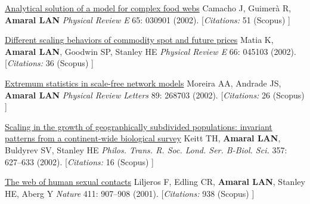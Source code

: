 \NumberedItem{\makebox[0.8cm][r]{[42]}}
\href{/people/amaral/analytical-solution-of-a-model-for-complex-food-webs}
{Analytical solution of a model for complex food webs}
\newline
Camacho J, Guimer\`a R, {\textbf{Amaral LAN}}
\newline
\textit{Physical Review E}
    65:
030901 (2002).
    [{\em{Citations:}}  51 (Scopus) ]
\newline
\Gap
~
\Gap

\NumberedItem{\makebox[0.8cm][r]{[41]}}
\href{/people/amaral/different-scaling-behaviors-of-commodity-spot-and-future-prices}
{Different scaling behaviors of commodity spot and future prices}
\newline
Matia K, {\textbf{Amaral LAN}}, Goodwin SP, Stanley HE
\newline
\textit{Physical Review E}
    66:
045103 (2002).
    [{\em{Citations:}}  36 (Scopus) ]
\newline
\Gap
~
\Gap

\NumberedItem{\makebox[0.8cm][r]{[40]}}
\href{/people/amaral/extremum-statistics-in-scale-free-network-models}
{Extremum statistics in scale-free network models}
\newline
Moreira AA, Andrade JS, {\textbf{Amaral LAN}}
\newline
\textit{Physical Review Letters}
    89:
268703 (2002).
    [{\em{Citations:}}  26 (Scopus) ]
\newline
\Gap
~
\Gap

\NumberedItem{\makebox[0.8cm][r]{[39]}}
\href{/people/amaral/scaling-in-the-growth-of-geographically-subdivided-populations-invariant-patterns-from-a-continent-wide-biological-survey}
{Scaling in the growth of geographically subdivided populations: invariant patterns from a continent-wide biological survey}
\newline
Keitt TH, {\textbf{Amaral LAN}}, Buldyrev SV, Stanley HE
\newline
\textit{Philos. Trans. R. Soc. Lond. Ser. B-Biol. Sci.}
    357:
627--633 (2002).
    [{\em{Citations:}}  16 (Scopus) ]
\newline
\Gap
~
\Gap

\NumberedItem{\makebox[0.8cm][r]{[38]}}
\href{/people/amaral/the-web-of-human-sexual-contacts}
{The web of human sexual contacts}
\newline
Liljeros F, Edling CR, {\textbf{Amaral LAN}}, Stanley HE, Aberg Y
\newline
\textit{Nature}
    411:
907--908 (2001).
    [{\em{Citations:}}  938 (Scopus) ]
\newline
\Gap
~
\Gap


